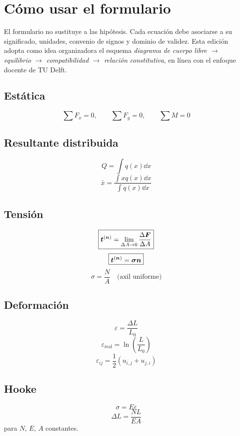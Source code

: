 \chapter*{Cómo usar el formulario}
El formulario no sustituye a las hipótesis. Cada ecuación debe asociarse a su significado, unidades, convenio de signos y dominio de validez. Esta edición adopta como idea organizadora el esquema \emph{diagrama de cuerpo libre $\rightarrow$ equilibrio $\rightarrow$ compatibilidad $\rightarrow$ relación constitutiva}, en línea con el enfoque docente de TU Delft.\autocite{tudelft-four-principles}



\section*{Estática}
\[
\boxed{\sum F_x=0,\qquad \sum F_y=0,\qquad \sum M=0}
\]

\section*{Resultante distribuida}
\[
\boxed{Q=\int q(x)\dd x}
\]
\[
\boxed{\bar x=\frac{\int xq(x)\dd x}{\int q(x)\dd x}}
\]

\section*{Tensión}
\[
\boxed{\boldsymbol{t}^{(\boldsymbol{n})}=\lim_{\Delta A\to0}\frac{\Delta\boldsymbol{F}}{\Delta A}}
\]
\[
\boxed{\boldsymbol{t}^{(\boldsymbol{n})}=\boldsymbol{\sigma}\boldsymbol{n}}
\]
\[
\boxed{\sigma=\frac{N}{A}\quad\text{(axil uniforme)}}
\]

\section*{Deformación}
\[
\boxed{\varepsilon=\frac{\Delta L}{L_0}}
\]
\[
\boxed{\varepsilon_{\mathrm{real}}=\ln\left(\frac{L}{L_0}\right)}
\]
\[
\boxed{\varepsilon_{ij}=\frac12(u_{i,j}+u_{j,i})}
\]

\section*{Hooke}
\[
\boxed{\sigma=E\varepsilon}
\]
\[
\boxed{\Delta L=\frac{NL}{EA}}
\]
para $N$, $E$, $A$ constantes.

